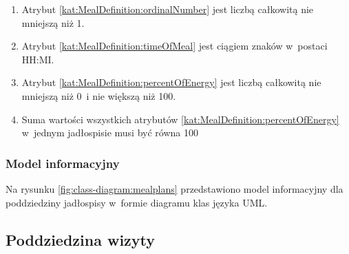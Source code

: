 \begin{itemize}[label={\textbf{Ograniczenia dla}}, wide, labelwidth=!, labelindent=0pt]
\begin{enumerate}[label={\textbf{OGR/4/\protect\twodigits{\arabic{enumi}}}}, wide, labelwidth=!, align=left, leftmargin=3cm, resume]
        \item Atrybut \ref{kat:MealDefinition:ordinalNumber} jest liczbą całkowitą nie mniejszą niż 1.
        \item Atrybut \ref{kat:MealDefinition:timeOfMeal} jest ciągiem znaków w~postaci HH:MI.
        \item Atrybut \ref{kat:MealDefinition:percentOfEnergy} jest liczbą całkowitą nie mniejszą niż 0~i nie większą niż 100.
        \item Suma wartości wszystkich atrybutów \ref{kat:MealDefinition:percentOfEnergy} w~jednym jadłospisie musi być równa 100
    \end{enumerate}
\end{itemize}

\subsubsection{Model informacyjny}\label{subsubsec:database:mealplans:domainModel}

Na rysunku \ref{fig:class-diagram:mealplans} przedstawiono model informacyjny dla poddziedziny jadłospisy w~formie diagramu klas języka UML.


\subsection{Poddziedzina wizyty}\label{subsec:database:appointments}


